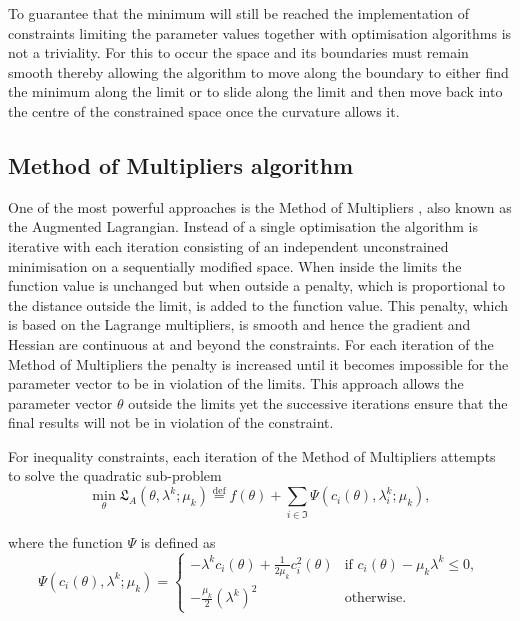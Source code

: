 To guarantee that the minimum will still be reached the implementation of constraints limiting the parameter values together with optimisation algorithms is not a triviality.  For this to occur the space and its boundaries must remain smooth thereby allowing the algorithm to move along the boundary to either find the minimum along the limit or to slide along the limit and then move back into the centre of the constrained space once the curvature allows it.



\subsection{Method of Multipliers algorithm}

One of the most powerful approaches is the Method of Multipliers \citep{NocedalWright99}, also known as the Augmented Lagrangian.  Instead of a single optimisation the algorithm is iterative with each iteration consisting of an independent unconstrained minimisation on a sequentially modified space.  When inside the limits the function value is unchanged but when outside a penalty, which is proportional to the distance outside the limit, is added to the function value.  This penalty, which is based on the Lagrange multipliers, is smooth and hence the gradient and Hessian are continuous at and beyond the constraints.  For each iteration of the Method of Multipliers the penalty is increased until it becomes impossible for the parameter vector to be in violation of the limits.  This approach allows the parameter vector $\theta$ outside the limits yet the successive iterations ensure that the final results will not be in violation of the constraint.

For inequality constraints, each iteration of the Method of Multipliers attempts to solve the quadratic sub-problem
\begin{equation} \label{eq: Augmented Lagrangian}
    \min_\theta \mathfrak{L}_A(\theta, \lambda^k; \mu_k) \stackrel{\mathrm{def}}{=} f(\theta) + \sum_{i \in \mathfrak{I}} \Psi(c_i(\theta), \lambda_i^k; \mu_k),
\end{equation}

\noindent where the function $\Psi$ is defined as
\begin{equation}
    \Psi(c_i(\theta), \lambda^k; \mu_k) = \begin{cases}
        -\lambda^k c_i(\theta) + \frac{1}{2\mu_k} c_i^2(\theta) & \textrm{if } c_i(\theta) - \mu_k \lambda^k \leqslant 0, \\
        -\frac{\mu_k}{2} (\lambda^k)^2 & \textrm{otherwise}.
    \end{cases}
\end{equation}

